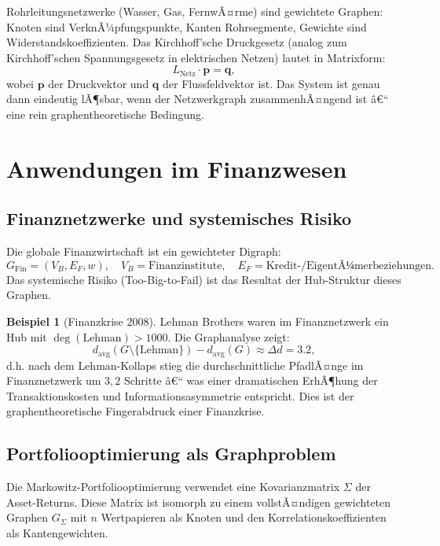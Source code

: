 ﻿\documentclass[12pt,a4paper,twoside]{article}
\theoremstyle{definition}
\newtheorem{beispiel}{Beispiel}[section]
\theoremstyle{plain}
\theoremstyle{remark}
\begin{document}
Rohrleitungsnetzwerke (Wasser, Gas, FernwÃ¤rme) sind gewichtete
Graphen: Knoten sind VerknÃ¼pfungspunkte, Kanten Rohrsegmente,
Gewichte sind Widerstandskoeffizienten.  Das Kirchhoff'sche
Druckgesetz (analog zum Kirchhoff'schen Spannungsgesetz in
elektrischen Netzen) lautet in Matrixform:
\[
  L_{\text{Netz}} \cdot \mathbf{p} = \mathbf{q},
\]
wobei $\mathbf{p}$ der Druckvektor und $\mathbf{q}$ der
Flussfeldvektor ist.  Das System ist genau dann eindeutig
lÃ¶sbar, wenn der Netzwerkgraph zusammenhÃ¤ngend ist â€“
eine rein graphentheoretische Bedingung.

\section{Anwendungen im Finanzwesen}
\label{sec:finanz}

\subsection{Finanznetzwerke und systemisches Risiko}

Die globale Finanzwirtschaft ist ein gewichteter Digraph:
\[
  G_{\text{Fin}} = (V_B, E_F, w), \quad
  V_B = \text{Finanzinstitute}, \quad
  E_F = \text{Kredit-/EigentÃ¼merbeziehungen}.
\]
Das systemische Risiko (Too-Big-to-Fail) ist das Resultat
der Hub-Struktur dieses Graphen.

\begin{beispiel}[Finanzkrise 2008]
Lehman Brothers waren im Finanznetzwerk ein Hub mit
$\deg(\text{Lehman}) > 1000$.  Die Graphanalyse zeigt:
\[
  d_{\text{avg}}(G \setminus \{\text{Lehman}\}) -
  d_{\text{avg}}(G) \approx \Delta d = 3.2,
\]
d.h. nach dem Lehman-Kollaps stieg die durchschnittliche
PfadlÃ¤nge im Finanznetzwerk um $3{,}2$ Schritte â€“ was einer
dramatischen ErhÃ¶hung der Transaktionskosten und
Informationsasymmetrie entspricht.  Dies ist der
graphentheoretische Fingerabdruck einer Finanzkrise.
\end{beispiel}

\subsection{Portfoliooptimierung als Graphproblem}

Die Markowitz-Portfoliooptimierung verwendet eine
Kovarianzmatrix $\Sigma$ der Asset-Returns.  Diese Matrix
ist isomorph zu einem vollstÃ¤ndigen gewichteten Graphen
$G_\Sigma$ mit $n$ Wertpapieren als Knoten und den
Korrelationskoeffizienten als Kantengewichten.
\end{document}
